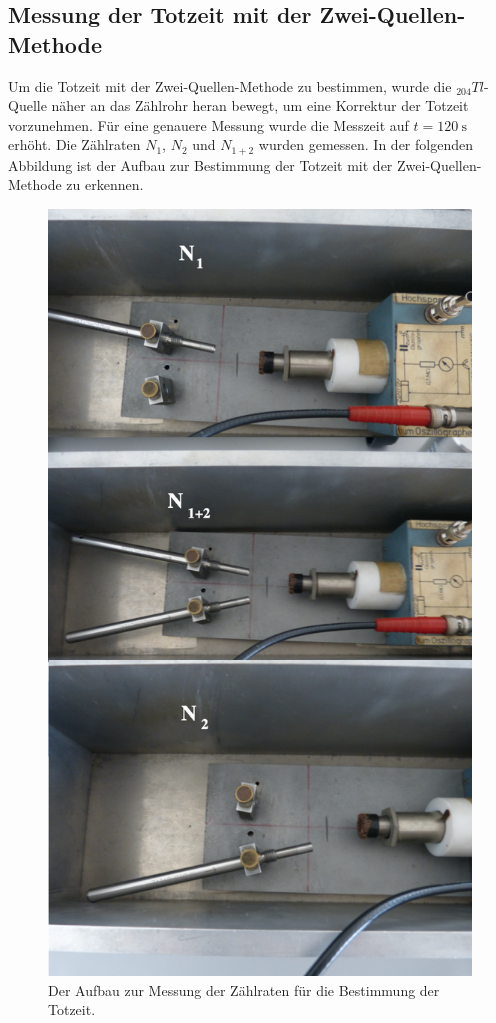 \subsection{Messung der Totzeit mit der Zwei-Quellen-Methode}
  Um die Totzeit mit der Zwei-Quellen-Methode zu bestimmen, wurde die $_{204}Tl$-Quelle näher an das
  Zählrohr heran bewegt, um eine Korrektur der Totzeit vorzunehmen. Für eine genauere Messung wurde
  die Messzeit auf $t = \SI{120}{\second}$ erhöht. Die Zählraten $N_{1}$, $N_{2}$ und $N_{1+2}$ wurden
  gemessen. In der folgenden Abbildung ist der Aufbau zur Bestimmung der Totzeit mit der Zwei-Quellen-
  Methode zu erkennen.
  \begin{figure}[H]
    \centering
      \includegraphics[scale=0.3]{content/totzeit2.png}
      \caption{Der Aufbau zur Messung der Zählraten für die Bestimmung der Totzeit.}
      \label{fig:totzeit2}
  \end{figure}
